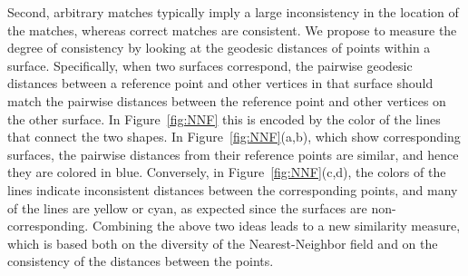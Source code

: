 Second, arbitrary matches typically imply a large inconsistency in the location of the matches, whereas correct matches are consistent.
We propose to measure the degree of consistency by looking at the geodesic distances of points within a surface.
Specifically, when two surfaces correspond, the pairwise geodesic  distances between a reference point and other vertices in that surface should match the pairwise distances between the reference point and other vertices on the other surface.
In Figure~\ref{fig:NNF} this is encoded by the color of the lines that connect the two shapes.
In Figure~\ref{fig:NNF}(a,b), which show corresponding surfaces, the pairwise distances from their reference points are similar, and hence  they are colored in blue.
Conversely, in Figure~\ref{fig:NNF}(c,d), the colors of the lines indicate inconsistent  distances between the corresponding points, and many of the lines are yellow or cyan, as expected since the surfaces are non-corresponding.
Combining the above two ideas leads to a new similarity measure, which is based both on the diversity of the Nearest-Neighbor field and on the consistency of the distances between the points.
